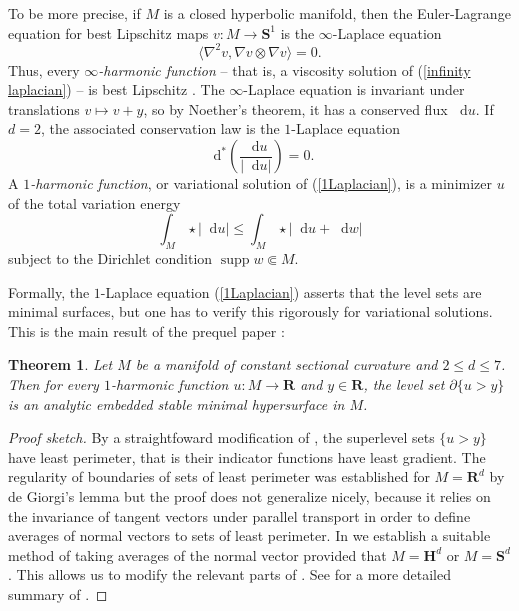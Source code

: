 \documentclass[final,12pt, leqno]{brownthesis}
\newcommand{\RR}{\mathbf{R}}
\newcommand{\Hyp}{\mathbf H}
\newcommand{\Sph}{\mathbf S}
\DeclareMathOperator{\supp}{supp}
\newcommand*\dif{\mathop{}\!\mathrm{d}}
\newcommand{\dfn}[1]{\emph{#1}\index{#1}}
\newtheorem{theorem}{Theorem}[section]
\theoremstyle{definition}
\numberwithin{equation}{section}
\begin{document}
To be more precise, if $M$ is a closed hyperbolic manifold, then the Euler-Lagrange equation for best Lipschitz maps $v: M \to \Sph^1$ is the $\infty$-Laplace equation
\begin{equation}\label{infinity laplacian}
	\langle \nabla^2 v, \nabla v \otimes \nabla v\rangle = 0.
\end{equation}
Thus, every \dfn{$\infty$-harmonic function} -- that is, a viscosity solution of (\ref{infinity laplacian}) -- is best Lipschitz \cite{daskalopoulos2020transverse}.
The $\infty$-Laplace equation is invariant under translations $v \mapsto v + y$, so by Noether's theorem, it has a conserved flux $\dif u$.
If $d = 2$, the associated conservation law is the $1$-Laplace equation
\begin{equation}\label{1Laplacian}
\dif^* \left(\frac{\dif u}{|\dif u|}\right) = 0.
\end{equation}
A \dfn{$1$-harmonic function}, or variational solution of (\ref{1Laplacian}), is a minimizer $u$ of the total variation energy
\begin{equation}\label{least gradient functional}
	\int_M \star |\dif u| \leq \int_M \star |\dif u + \dif w|
\end{equation}
subject to the Dirichlet condition $\supp w \Subset M$.

Formally, the $1$-Laplace equation (\ref{1Laplacian}) asserts that the level sets are minimal surfaces, but one has to verify this rigorously for variational solutions.
This is the main result of the prequel paper \cite{BackusFLG}:

\begin{theorem}\label{main thm of old paper}
Let $M$ be a manifold of constant sectional curvature and $2 \leq d \leq 7$.
Then for every $1$-harmonic function $u: M \to \RR$ and $y \in \RR$, the level set $\partial \{u > y\}$ is an analytic embedded stable minimal hypersurface in $M$.
\end{theorem}
\begin{proof}[Proof sketch]
By a straightfoward modification of \cite[Theorem 1]{BOMBIERI1969}, the superlevel sets $\{u > y\}$ have least perimeter, that is their indicator functions have least gradient.
The regularity of boundaries of sets of least perimeter was established for $M = \RR^d$ by de Giorgi's lemma \cite{Miranda66} but the proof does not generalize nicely, because it relies on the invariance of tangent vectors under parallel transport in order to define averages of normal vectors to sets of least perimeter.
In \cite[\S3]{BackusFLG} we establish a suitable method of taking averages of the normal vector provided that $M = \Hyp^d$ or $M = \Sph^d$.
This allows us to modify the relevant parts of \cite{Miranda66}.
See \cite[\S1]{BackusFLG} for a more detailed summary of \cite{BackusFLG}.
\end{proof}
\end{document}
